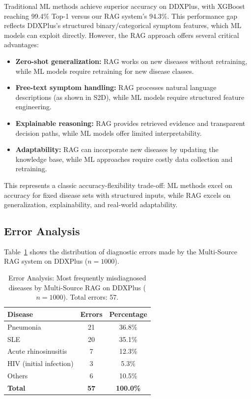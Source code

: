 \documentclass[preprint,12pt]{elsarticle}
\begin{document}
Traditional ML methods achieve superior accuracy on DDXPlus, with XGBoost reaching 99.4\% Top-1 versus our RAG system's 94.3\%. This performance gap reflects DDXPlus's structured binary/categorical symptom features, which ML models can exploit directly. However, the RAG approach offers several critical advantages:

\begin{itemize}
    \item \textbf{Zero-shot generalization:} RAG works on new diseases without retraining, while ML models require retraining for new disease classes.
    \item \textbf{Free-text symptom handling:} RAG processes natural language descriptions (as shown in S2D), while ML models require structured feature engineering.
    \item \textbf{Explainable reasoning:} RAG provides retrieved evidence and transparent decision paths, while ML models offer limited interpretability.
    \item \textbf{Adaptability:} RAG can incorporate new diseases by updating the knowledge base, while ML approaches require costly data collection and retraining.
\end{itemize}

This represents a classic accuracy-flexibility trade-off: ML methods excel on accuracy for fixed disease sets with structured inputs, while RAG excels on generalization, explainability, and real-world adaptability.

\subsection{Error Analysis}
\label{sec:error_analysis}

Table~\ref{tab:error_analysis} shows the distribution of diagnostic errors made by the Multi-Source RAG system on DDXPlus ($n{=}1000$).

\begin{table}[t]
\centering
\caption{Error Analysis: Most frequently misdiagnosed diseases by Multi-Source RAG on DDXPlus ($n{=}1000$). Total errors: 57.}
\label{tab:error_analysis}
\begin{tabular}{lcc}
\toprule
\textbf{Disease} & \textbf{Errors} & \textbf{Percentage} \\
\midrule
Pneumonia & 21 & 36.8\% \\
SLE & 20 & 35.1\% \\
Acute rhinosinusitis & 7 & 12.3\% \\
HIV (initial infection) & 3 & 5.3\% \\
Others & 6 & 10.5\% \\
\midrule
\textbf{Total} & \textbf{57} & \textbf{100.0\%} \\
\bottomrule
\end{tabular}
\end{table}
\end{document}
